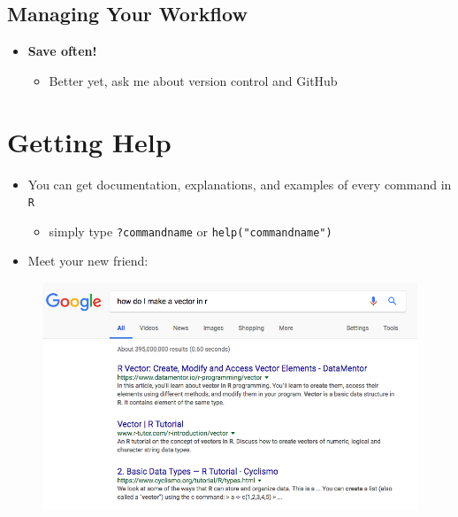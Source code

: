 \documentclass[]{book}
\newenvironment{Shaded}{\begin{snugshade}}{\end{snugshade}}
\newcommand{\KeywordTok}[1]{\textcolor[rgb]{0.13,0.29,0.53}{\textbf{#1}}}
\newcommand{\DataTypeTok}[1]{\textcolor[rgb]{0.13,0.29,0.53}{#1}}
\newcommand{\CommentTok}[1]{\textcolor[rgb]{0.56,0.35,0.01}{\textit{#1}}}
\newcommand{\OperatorTok}[1]{\textcolor[rgb]{0.81,0.36,0.00}{\textbf{#1}}}
\newcommand{\NormalTok}[1]{#1}
\providecommand{\tightlist}{%
  \setlength{\itemsep}{0pt}\setlength{\parskip}{0pt}}
\theoremstyle{definition}
\theoremstyle{definition}
\theoremstyle{definition}
\theoremstyle{remark}
\begin{document}
\begin{Shaded}
\end{Shaded}

\subsection{Managing Your Workflow}\label{managing-your-workflow}

\begin{itemize}
\tightlist
\item
  \textbf{Save often!}

  \begin{itemize}
  \tightlist
  \item
    Better yet, ask me about version control and GitHub
  \end{itemize}
\end{itemize}

\section{Getting Help}\label{getting-help}

\begin{itemize}
\tightlist
\item
  You can get documentation, explanations, and examples of every command
  in \texttt{R}

  \begin{itemize}
  \tightlist
  \item
    simply type \texttt{?commandname} or \texttt{help("commandname")}
  \end{itemize}
\item
  Meet your new friend:
\end{itemize}

\begin{figure}
\centering
\includegraphics{images/googlehelp.png}
\caption{}
\end{figure}
\end{document}
